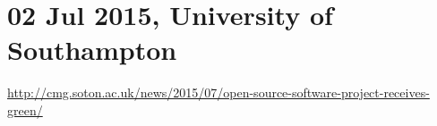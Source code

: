\documentclass{deliverablereport}
\begin{document}
\clearpage

\section{02 Jul 2015, University of Southampton}

{\scriptsize \url{http://cmg.soton.ac.uk/news/2015/07/open-source-software-project-receives-green/}}

\bigskip
\end{document}
